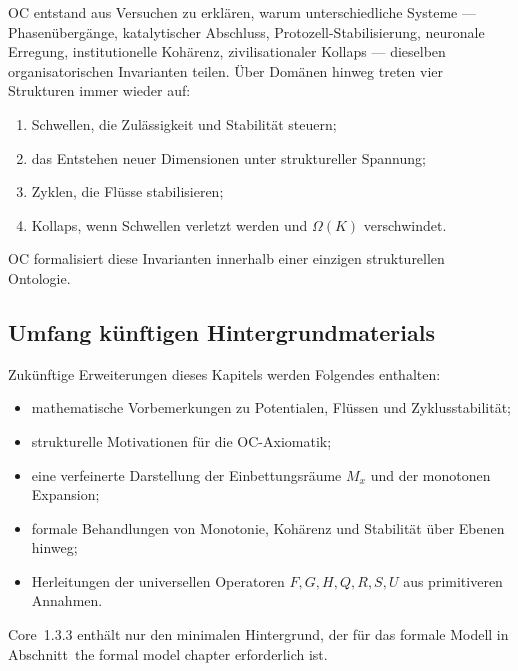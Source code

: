 OC entstand aus Versuchen zu erklären, warum unterschiedliche Systeme --- Phasenübergänge, katalytischer Abschluss, Protozell-Stabilisierung, neuronale Erregung, institutionelle Kohärenz, zivilisationaler Kollaps --- dieselben organisatorischen Invarianten teilen.
Über Domänen hinweg treten vier Strukturen immer wieder auf:

\begin{enumerate}
    \item Schwellen, die Zulässigkeit und Stabilität steuern;
    \item das Entstehen neuer Dimensionen unter struktureller Spannung;
    \item Zyklen, die Flüsse stabilisieren;
    \item Kollaps, wenn Schwellen verletzt werden und \(\Omega(K)\) verschwindet.
\end{enumerate}

OC formalisiert diese Invarianten innerhalb einer einzigen strukturellen Ontologie.

\subsection{Umfang künftigen Hintergrundmaterials}

Zukünftige Erweiterungen dieses Kapitels werden Folgendes enthalten:

\begin{itemize}
    \item mathematische Vorbemerkungen zu Potentialen, Flüssen und Zyklusstabilität;
    \item strukturelle Motivationen für die OC-Axiomatik;
    \item eine verfeinerte Darstellung der Einbettungsräume \(M_x\) und der monotonen Expansion;
    \item formale Behandlungen von Monotonie, Kohärenz und Stabilität über Ebenen hinweg;
    \item Herleitungen der universellen Operatoren \(F,G,H,Q,R,S,U\) aus primitiveren Annahmen.
\end{itemize}

Core~1.3.3 enthält nur den minimalen Hintergrund, der für das formale Modell in Abschnitt~the formal model chapter erforderlich ist.
